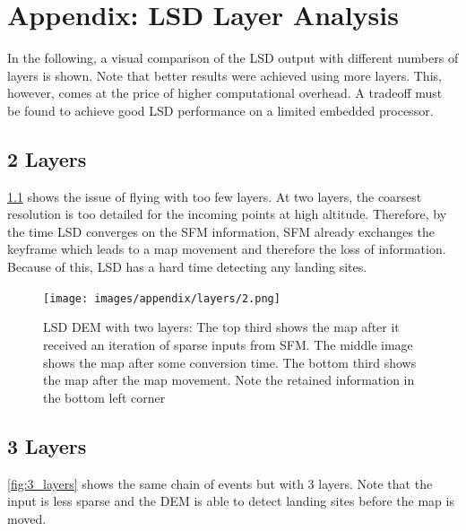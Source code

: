 \chapter{Appendix: LSD Layer Analysis}
\label{sec:layers}

In the following, a visual comparison of the LSD output with different numbers of layers is shown. Note that better results were achieved using more layers. This, however, comes at the price of higher computational overhead. A tradeoff must be found to achieve good LSD performance on a limited embedded processor.

\section{2 Layers}

\cref{fig:2_layers} shows the issue of flying with too few layers. At two layers, the coarsest resolution is too detailed for the incoming points at high altitude. Therefore, by the time LSD converges on the SFM information, SFM already exchanges the keyframe which leads to a map movement and therefore the loss of information. Because of this, LSD has a hard time detecting any landing sites.

\begin{figure}[h]
\centering
\texttt{[image: images/appendix/layers/2.png]}
\caption{LSD DEM with two layers: The top third shows the map after it received an iteration of sparse inputs from SFM. The middle image shows the map after some conversion time. The bottom third shows the map after the map movement. Note the retained information in the bottom left corner}
\label{fig:2_layers}
\end{figure}

\section{3 Layers}

\cref{fig:3_layers} shows the same chain of events but with 3 layers. Note that the input is less sparse and the DEM is able to detect landing sites before the map is moved.

